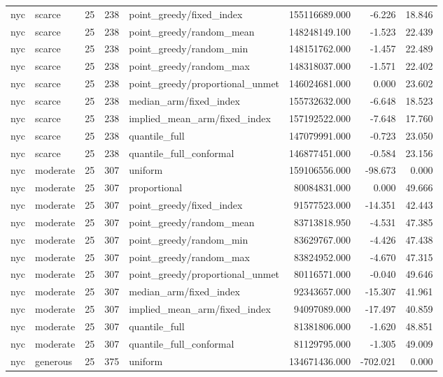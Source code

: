 \begin{tabular}{llrrlrrr}
nyc & scarce & 25 & 238 & point\_greedy/fixed\_index & 155116689.000 & -6.226 & 18.846 \\
nyc & scarce & 25 & 238 & point\_greedy/random\_mean & 148248149.100 & -1.523 & 22.439 \\
nyc & scarce & 25 & 238 & point\_greedy/random\_min & 148151762.000 & -1.457 & 22.489 \\
nyc & scarce & 25 & 238 & point\_greedy/random\_max & 148318037.000 & -1.571 & 22.402 \\
nyc & scarce & 25 & 238 & point\_greedy/proportional\_unmet & 146024681.000 & 0.000 & 23.602 \\
nyc & scarce & 25 & 238 & median\_arm/fixed\_index & 155732632.000 & -6.648 & 18.523 \\
nyc & scarce & 25 & 238 & implied\_mean\_arm/fixed\_index & 157192522.000 & -7.648 & 17.760 \\
nyc & scarce & 25 & 238 & quantile\_full & 147079991.000 & -0.723 & 23.050 \\
nyc & scarce & 25 & 238 & quantile\_full\_conformal & 146877451.000 & -0.584 & 23.156 \\
nyc & moderate & 25 & 307 & uniform & 159106556.000 & -98.673 & 0.000 \\
nyc & moderate & 25 & 307 & proportional & 80084831.000 & 0.000 & 49.666 \\
nyc & moderate & 25 & 307 & point\_greedy/fixed\_index & 91577523.000 & -14.351 & 42.443 \\
nyc & moderate & 25 & 307 & point\_greedy/random\_mean & 83713818.950 & -4.531 & 47.385 \\
nyc & moderate & 25 & 307 & point\_greedy/random\_min & 83629767.000 & -4.426 & 47.438 \\
nyc & moderate & 25 & 307 & point\_greedy/random\_max & 83824952.000 & -4.670 & 47.315 \\
nyc & moderate & 25 & 307 & point\_greedy/proportional\_unmet & 80116571.000 & -0.040 & 49.646 \\
nyc & moderate & 25 & 307 & median\_arm/fixed\_index & 92343657.000 & -15.307 & 41.961 \\
nyc & moderate & 25 & 307 & implied\_mean\_arm/fixed\_index & 94097089.000 & -17.497 & 40.859 \\
nyc & moderate & 25 & 307 & quantile\_full & 81381806.000 & -1.620 & 48.851 \\
nyc & moderate & 25 & 307 & quantile\_full\_conformal & 81129795.000 & -1.305 & 49.009 \\
nyc & generous & 25 & 375 & uniform & 134671436.000 & -702.021 & 0.000 \\

\end{tabular}
